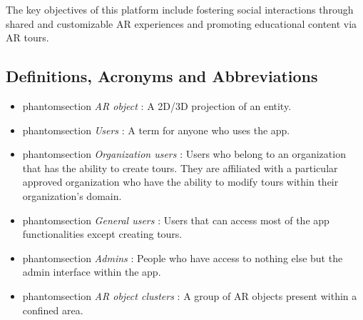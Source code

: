 \documentclass{article}
\makeatletter
\newcommand{\labeltext}[3][]{%
    \@bsphack%
    \csname phantomsection\endcsname%
    \def\tst{#1}%
    \def\labelmarkup{\emph}%
    \def\refmarkup{}%
    \ifx\tst\empty\def\@currentlabel{\refmarkup{#2}}{\label{#3}}%
    \else\def\@currentlabel{\refmarkup{#1}}{\label{#3}}\fi%
    \@esphack%
    \labelmarkup{#2}%
}
\makeatother
\begin{document}
The key objectives of this platform include fostering social interactions through shared and customizable AR experiences and promoting educational content via AR tours.

\subsection{Definitions, Acronyms and Abbreviations}
\label{sub:def_acr_abb}

\begin{itemize}
    \item \labeltext{AR object}{def:ar_obj}: A 2D/3D projection of an entity.
    \item \labeltext{Users}{def:user}: A term for anyone who uses the app.
    \item \labeltext{Organization users}{def:org_user}: Users who belong to an organization that has the ability to create tours. They are affiliated with a particular approved organization who have the ability to modify tours within their organization’s domain.
    \item \labeltext{General users}{def:gen_user}: Users that can access most of the app functionalities except creating tours.
    \item \labeltext{Admins}{def:admin}: People who have access to nothing else but the admin interface within the app.
    \item \labeltext{AR object clusters}{def:ar_obj_cls}: A group of AR objects present within a confined area.
\end{itemize}
\end{document}
